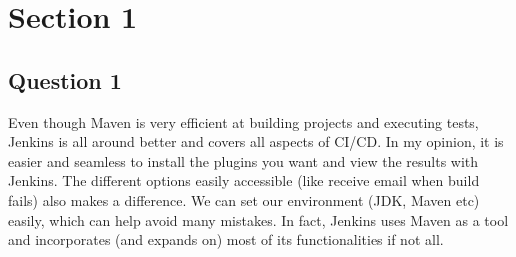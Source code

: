 \newpage
\section*{Section 1}
\subsection*{Question 1}

\noindent Even though Maven is very efficient at building projects and executing tests, Jenkins is all around better and covers all aspects of CI/CD. In my opinion, it is easier and seamless to install the plugins you want and view the results with Jenkins. The different options easily accessible (like receive email when build fails) also makes a difference. We can set our environment (JDK, Maven etc) easily, which can help avoid many mistakes. In fact, Jenkins uses Maven as a tool and incorporates (and expands on) most of its functionalities if not all.


